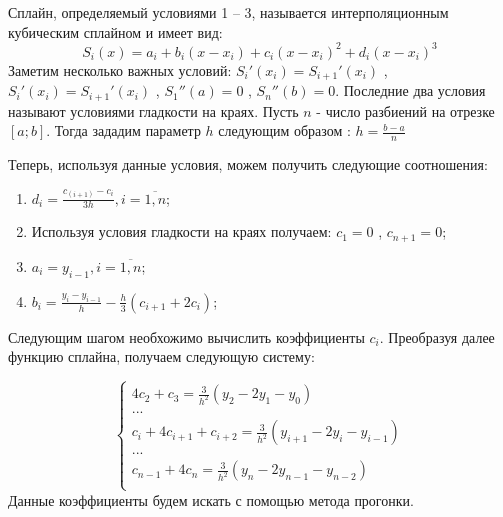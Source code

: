 \documentclass [12pt]{article}
\begin{document}
Сплайн, определяемый условиями 1 – 3, называется интерполяционным кубическим сплайном и имеет вид:
$$S_i(x) = a_i + b_i(x - x_i) + c_i(x - x_i)^2 + d_i(x - x_i)^3$$
Заметим несколько важных условий: $S_i'(x_i) = S_{i+1}'(x_i)$ , $S_i'(x_i) = S_{i+1}'(x_i)$ , $S_{1}''(a) = 0$ , $S_n''(b) = 0$. Последние два условия называют условиями гладкости на краях.
Пусть $n$ - число разбиений на отрезке $[a;b]$. Тогда зададим параметр $h$ следующим образом : $h = \frac{b - a}{n}$

Теперь, используя данные условия, можем получить следующие соотношения:
\begin{enumerate}
\item $d_i = \frac{c_(i+1) - c_i}{3h} , i = \overline{1,n}$;
\item Используя условия гладкости на краях получаем: $c_{1} = 0$ , $c_{n+1} = 0$;
\item $a_i = y_{i-1} , i = \overline{1,n}$;
\item $b_i = \frac{y_i - y_{i-1}}{h} - \frac{h}{3}(c_{i+1} + 2c_i)$;
\end{enumerate}
Следующим шагом необхожимо вычислить коэффициенты $c_i$. Преобразуя далее функцию сплайна, получаем следующую систему:

\begin{equation*}
\begin{cases}
4c_2 + c_3 = \frac{3}{h^2}(y_2 - 2y_1 - y_0) \\
... \\
c_i + 4c_{i+1} + c_{i+2} = \frac{3}{h^2}(y_{i+1} - 2y_i - y_{i-1}) \\
... \\
c_{n-1} + 4c_n = \frac{3}{h^2}(y_n - 2y_{n-1} - y_{n-2}) \\
\end{cases}
\end{equation*}
Данные коэффициенты будем искать с помощью метода прогонки.
\end{document}
